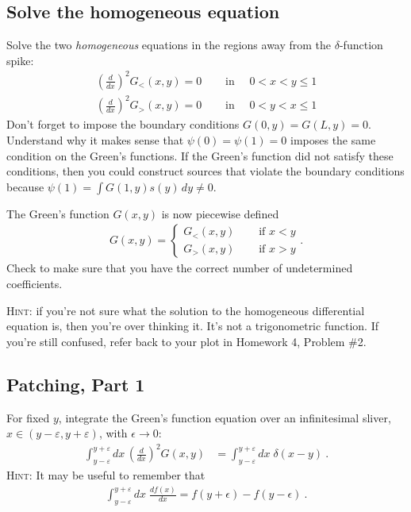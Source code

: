 \documentclass[12pt]{article}
\numberwithin{equation}{section}    %
\begin{document}
\subsection{Solve the homogeneous equation}

Solve the two \emph{homogeneous} equations in the regions away from the $\delta$-function spike:
\begin{align}
 	\left(\frac{d}{dx}\right)^2 G_{<}(x,y) = 0  
 	& \quad\text{ in }\quad 0 < x < y \leq 1 
 	\\
 	\left(\frac{d}{dx}\right)^2 G_{>}(x,y) = 0  
 	& \quad\text{ in }\quad 0 < y < x \leq 1
\end{align}
Don't forget to impose the boundary conditions $G(0, y) = G(L,y) = 0$. Understand why it makes sense that $\psi(0) = \psi(1) = 0$ imposes the same condition on the Green's functions. If the Green's function did not satisfy these conditions, then you could construct sources that violate the boundary conditions because $\psi(1) = \int G(1,y) s(y)\, dy \neq 0$.

The Green's function $G(x,y)$ is now piecewise defined
\begin{align}G(x,y) = \left\{ 
\begin{array}{ll}
 	G_<(x,y) & \quad\text{ if } x<y\\
 	G_>(x,y) & \quad\text{ if } x>y
 \end{array}\right. .
 \label{eq:piecewise:def}
 \end{align}
Check to make sure that you have the correct number of undetermined coefficients. 

\textsc{Hint}: if you're not sure what the solution to the homogeneous differential equation is, then you're over thinking it. It's not a trigonometric function. If you're still confused, refer back to your plot in Homework 4, Problem \#2.

\subsection{Patching, Part 1}
For fixed $y$, integrate the Green's function equation over an infinitesimal sliver, $x \in (y-\varepsilon, y + \varepsilon)$, with $\epsilon \to 0$: 
\begin{align}
	\int_{y-\varepsilon}^{y+\varepsilon} dx\, \left(\frac{d}{dx}\right)^2 G(x,y) &=  
	\int_{y-\varepsilon}^{y+\varepsilon} dx\; \delta(x-y)
	\ .
	\label{eq:patching:1}
\end{align}
\textsc{Hint}: It may be useful to remember that
\begin{align}
	\int_{y-\varepsilon}^{y+\varepsilon} dx\; \frac{df(x)}{dx} = f(y+\epsilon) - f(y-\epsilon) \ .
\end{align}
\end{document}
